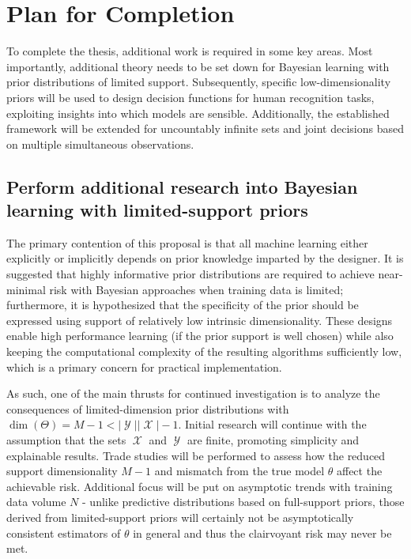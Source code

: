 \documentclass[12pt]{report}
\DeclareMathOperator{\Xcal}{\mathcal{X}}
\DeclareMathOperator{\Ycal}{\mathcal{Y}}
\begin{document}
\chapter{Plan for Completion}

To complete the thesis, additional work is required in some key areas. Most importantly, additional theory needs to be set down for Bayesian learning with prior distributions of limited support. Subsequently, specific low-dimensionality priors will be used to design decision functions for human recognition tasks, exploiting insights into which models are sensible. Additionally, the established framework will be extended for uncountably infinite sets and joint decisions based on multiple simultaneous observations. 


\section{Perform additional research into Bayesian learning with limited-support priors}

The primary contention of this proposal is that all machine learning either explicitly or implicitly depends on prior knowledge imparted by the designer. It is suggested that highly informative prior distributions are required to achieve near-minimal risk with Bayesian approaches when training data is limited; furthermore, it is hypothesized that the specificity of the prior should be expressed using support of relatively low intrinsic dimensionality. These designs enable high performance learning (if the prior support is well chosen) while also keeping the computational complexity of the resulting algorithms sufficiently low, which is a primary concern for practical implementation. 

As such, one of the main thrusts for continued investigation is to analyze the consequences of limited-dimension prior distributions with $\dim(\Theta) = M-1 < |\Ycal||\Xcal| - 1$. Initial research will continue with the assumption that the sets $\Xcal$ and $\Ycal$ are finite, promoting simplicity and explainable results. Trade studies will be performed to assess how the reduced support dimensionality $M-1$ and mismatch from the true model $\theta$ affect the achievable risk. Additional focus will be put on asymptotic trends with training data volume $N$ - unlike predictive distributions based on full-support priors, those derived from limited-support priors will certainly not be asymptotically consistent estimators of $\theta$ in general and thus the clairvoyant risk may never be met. 
\end{document}
